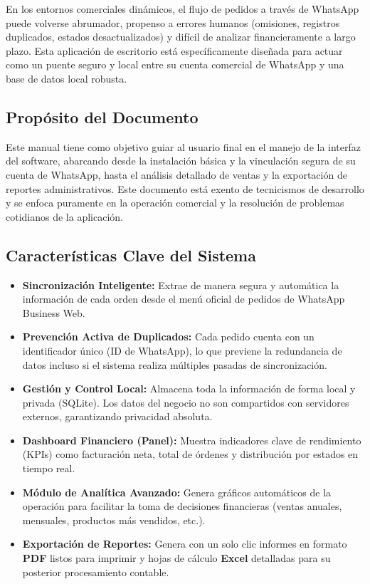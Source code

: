 \documentclass[11pt,a4paper]{article}
\begin{document}
En los entornos comerciales dinámicos, el flujo de pedidos a través de WhatsApp puede volverse abrumador, propenso a errores humanos (omisiones, registros duplicados, estados desactualizados) y difícil de analizar financieramente a largo plazo. Esta aplicación de escritorio está específicamente diseñada para actuar como un puente seguro y local entre su cuenta comercial de WhatsApp y una base de datos local robusta.

\subsection{Propósito del Documento}
Este manual tiene como objetivo guiar al usuario final en el manejo de la interfaz del software, abarcando desde la instalación básica y la vinculación segura de su cuenta de WhatsApp, hasta el análisis detallado de ventas y la exportación de reportes administrativos. Este documento está exento de tecnicismos de desarrollo y se enfoca puramente en la operación comercial y la resolución de problemas cotidianos de la aplicación.

\subsection{Características Clave del Sistema}
\begin{itemize}
    \item \textbf{Sincronización Inteligente:} Extrae de manera segura y automática la información de cada orden desde el menú oficial de pedidos de WhatsApp Business Web.
    \item \textbf{Prevención Activa de Duplicados:} Cada pedido cuenta con un identificador único (ID de WhatsApp), lo que previene la redundancia de datos incluso si el sistema realiza múltiples pasadas de sincronización.
    \item \textbf{Gestión y Control Local:} Almacena toda la información de forma local y privada (SQLite). Los datos del negocio no son compartidos con servidores externos, garantizando privacidad absoluta.
    \item \textbf{Dashboard Financiero (Panel):} Muestra indicadores clave de rendimiento (KPIs) como facturación neta, total de órdenes y distribución por estados en tiempo real.
    \item \textbf{Módulo de Analítica Avanzado:} Genera gráficos automáticos de la operación para facilitar la toma de decisiones financieras (ventas anuales, mensuales, productos más vendidos, etc.).
    \item \textbf{Exportación de Reportes:} Genera con un solo clic informes en formato \textbf{PDF} listos para imprimir y hojas de cálculo \textbf{Excel} detalladas para su posterior procesamiento contable.
\end{itemize}
\end{document}
